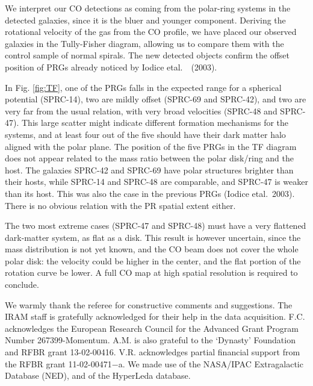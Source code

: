\documentclass[traditabstract]{aa}
\def\ts     {\thinspace}
\def\etal   {{\rm et\ts al.}~}
\begin{document}
 We interpret our CO detections as coming from the polar-ring systems in 
the detected galaxies, since it is the bluer and younger component.
Deriving the rotational velocity of the gas from the CO profile, we
have placed our observed galaxies in the Tully-Fisher diagram, allowing us
to compare them with the control sample of normal spirals.
 The new detected objects confirm the offset position of PRGs already
noticed by Iodice \etal\, (2003).

 In Fig. \ref{fig:TF}, one of the PRGs falls in the expected range
for a spherical potential (SPRC-14), two are mildly offset (SPRC-69 and SPRC-42),
and two are very far from the usual relation, with very broad velocities
(SPRC-48 and SPRC-47). This large scatter might indicate different
formation mechanisms for the systems, and at least four out of the five should have
their dark matter halo aligned with the polar plane. 
The position of the five PRGs in the TF diagram does not appear related to 
the mass ratio between the polar disk/ring and the host. The galaxies SPRC-42 and  SPRC-69 have 
polar structures brighter than their hosts, while  SPRC-14 and  SPRC-48 are comparable,
and SPRC-47 is weaker than its host. This was also the case in the previous
PRGs (Iodice \etal 2003). There is no obvious relation with the PR spatial extent either.

The two most extreme cases
(SPRC-47 and SPRC-48) must have a very flattened dark-matter system,
as flat as a disk. This result is however uncertain, since the mass distribution
is not yet known, and the CO beam does not cover the whole polar disk: the velocity
could be higher in the center, and the flat portion of the rotation curve be lower.
A full CO map at high spatial resolution is required to conclude.


\begin{acknowledgements}
 We warmly thank the referee for constructive comments and suggestions. 
The IRAM staff is gratefully acknowledged for their
help in the data acquisition. 
F.C. acknowledges the European Research Council
for the Advanced Grant Program Number 267399-Momentum.
A.M. is also grateful to the ‘Dynasty’ Foundation and RFBR grant 13-02-00416.
V.R. acknowledges partial financial support from the RFBR grant
11-02-00471−a.
We made use of the NASA/IPAC Extragalactic Database (NED),
and of the HyperLeda database.
\end{acknowledgements}
\end{document}
